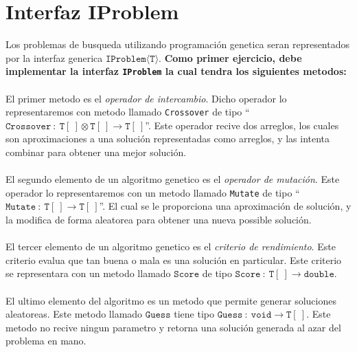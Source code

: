 \documentclass{article}
\begin{document}
\section*{Interfaz IProblem}
Los problemas de busqueda utilizando programaci\'on genetica seran representados por
la interfaz generica $\mathtt{IProblem\langle T\rangle}$. {\bf Como primer ejercicio, 
debe implementar la interfaz \texttt{IProblem} la cual tendra los siguientes metodos:}
\\\\
El primer metodo es el \emph{operador de intercambio}. Dicho
operador lo representaremos con metodo llamado \texttt{Crossover} de tipo ``$\mathtt{Crossover}\ 
:\ \mathtt{T}[\ ]\otimes\mathtt{T}[\ ]\rightarrow\mathtt{T}[\ ]$''. Este operador recive
dos arreglos, los cuales son aproximaciones a una soluci\'on representadas como arreglos,
y las intenta combinar para obtener una mejor soluci\'on.
\\\\
El segundo elemento de un algoritmo genetico es el \emph{operador de mutaci\'on}. Este
operador lo representaremos con un metodo llamado \texttt{Mutate} de tipo ``$\mathtt{Mutate}\ :\ 
\mathtt{T}[\ ]\rightarrow\mathtt{T}[\ ]$''. El cual se le proporciona una aproximaci\'on
de soluci\'on, y la modifica de forma aleatorea para obtener una nueva possible soluci\'on.
\\\\
El tercer elemento de un algoritmo genetico es el \emph{criterio de rendimiento}. Este
criterio evalua que tan buena o mala es una soluci\'on en particular. Este criterio se
representara con un metodo llamado $\mathtt{Score}$ de tipo $\mathtt{Score}\ :\ \mathtt{T}[\ ]
\rightarrow \mathtt{double}$. 
\\\\
El ultimo elemento del algoritmo es un metodo que permite generar soluciones aleatoreas.
Este metodo llamado $\mathtt{Guess}$ tiene tipo $\mathtt{Guess}\ :\ \mathtt{void}\rightarrow
\mathtt{T}[\ ]$. Este metodo no recive ningun parametro y retorna una soluci\'on generada
al azar del problema en mano.
\end{document}
